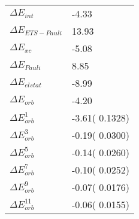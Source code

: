 \begin{table}[]
\caption{}
\label{}
\begin{tabular}{ll}
\hline
$\Delta E_{int}$          &        -4.33   \\
$\Delta E_{ETS-Pauli}$    &        13.93   \\
$\Delta E_{xc}$           &        -5.08   \\
$\Delta E_{Pauli}$        &         8.85   \\
$\Delta E_{elstat}$       &        -8.99   \\
$\Delta E_{orb}$          &        -4.20   \\
$\Delta E^{1}_{orb}$      &        -3.61(      0.1328)   \\
$\Delta E^{3}_{orb}$      &        -0.19(      0.0300)   \\
$\Delta E^{5}_{orb}$      &        -0.14(      0.0260)   \\
$\Delta E^{7}_{orb}$      &        -0.10(      0.0252)   \\
$\Delta E^{9}_{orb}$      &        -0.07(      0.0176)   \\
$\Delta E^{11}_{orb}$     &        -0.06(      0.0155)   \\
\end{tabular}
\end{table}
